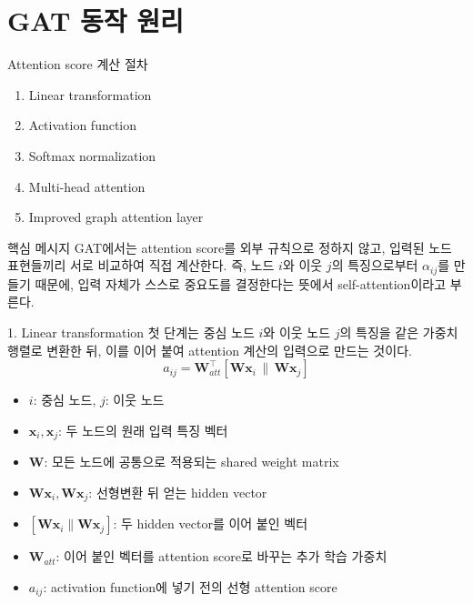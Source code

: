 \section{GAT 동작 원리}

\begin{frame}{Attention score 계산 절차}
\begin{enumerate}
  \item Linear transformation
  \item Activation function
  \item Softmax normalization
  \item Multi-head attention
  \item Improved graph attention layer
\end{enumerate}
\vspace{0.3em}
\begin{block}{핵심 메시지}
GAT에서는 attention score를 외부 규칙으로 정하지 않고, 입력된 노드 표현들끼리 서로 비교하여 직접 계산한다.
즉, 노드 $i$와 이웃 $j$의 특징으로부터 $\alpha_{ij}$를 만들기 때문에, 입력 자체가 스스로 중요도를 결정한다는 뜻에서 self-attention이라고 부른다.
\end{block}
\end{frame}

\begin{frame}{1. Linear transformation}
\small
첫 단계는 중심 노드 $i$와 이웃 노드 $j$의 특징을 같은 가중치 행렬로 변환한 뒤, 이를 이어 붙여 attention 계산의 입력으로 만드는 것이다.
\[
a_{ij} = \mathbf{W}_{att}^{\top}[\mathbf{W}\mathbf{x}_i \, \| \, \mathbf{W}\mathbf{x}_j]
\]
\vspace{0.3em}
\begin{itemize}
  \item $i$: 중심 노드, $j$: 이웃 노드
  \item $\mathbf{x}_i, \mathbf{x}_j$: 두 노드의 원래 입력 특징 벡터
  \item $\mathbf{W}$: 모든 노드에 공통으로 적용되는 shared weight matrix
  \item $\mathbf{W}\mathbf{x}_i, \mathbf{W}\mathbf{x}_j$: 선형변환 뒤 얻는 hidden vector
  \item $[\mathbf{W}\mathbf{x}_i \| \mathbf{W}\mathbf{x}_j]$: 두 hidden vector를 이어 붙인 벡터
  \item $\mathbf{W}_{att}$: 이어 붙인 벡터를 attention score로 바꾸는 추가 학습 가중치
  \item $a_{ij}$: activation function에 넣기 전의 선형 attention score
\end{itemize}
\end{frame}

